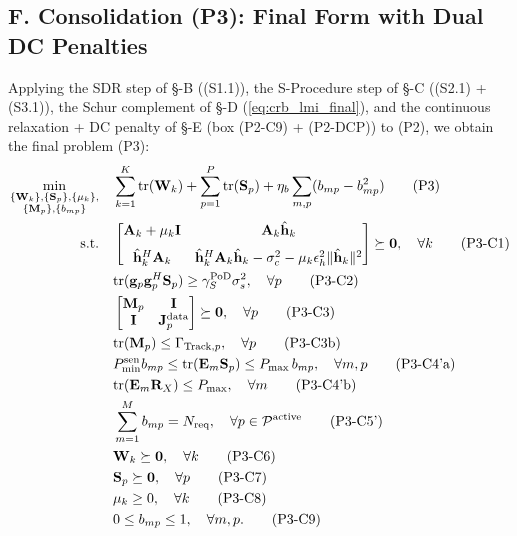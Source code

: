 \documentclass[12pt,a4paper]{article}
\newcommand{\vect}[1]{\mathbf{#1}}
\newcommand{\mat}[1]{\mathbf{#1}}
\newcommand{\tr}{\text{tr}}
\begin{document}
\subsection*{F. Consolidation (P3): Final Form with Dual DC Penalties}

Applying the SDR step of \S-B ((S1.1)), the S-Procedure step of \S-C ((S2.1) + (S3.1)), the Schur complement of \S-D (\eqref{eq:crb_lmi_final}), and the continuous relaxation + DC penalty of \S-E (box (P2-C9) + (P2-DCP)) to (P2), we obtain the final problem (P3):
\begin{align}
\min_{\substack{\{\mat{W}_k\}, \{\mat{S}_p\}, \{\mu_k\}, \\ \{\mat{M}_p\}, \{b_{mp}\}}} \quad
& \sum_{k=1}^K \tr(\mat{W}_k) + \sum_{p=1}^P \tr(\mat{S}_p) + \eta_b \sum_{m, p} (b_{mp} - b_{mp}^2) \tag{P3} \\
\text{s.t.} \quad
& \begin{bmatrix} \mat{A}_k + \mu_k \mat{I} & \mat{A}_k \hat{\vect{h}}_k \\[1.5ex] \hat{\vect{h}}_k^H \mat{A}_k & \hat{\vect{h}}_k^H \mat{A}_k \hat{\vect{h}}_k - \sigma_c^2 - \mu_k \epsilon_h^2 \|\hat{\vect{h}}_k\|^2 \end{bmatrix} \succeq \mat{0}, \quad \forall k \tag{P3-C1} \label{eq:p3c1} \\
& \tr(\vect{g}_p \vect{g}_p^H \mat{S}_p) \geq \gamma_S^{\text{PoD}} \sigma_s^2, \quad \forall p \tag{P3-C2} \label{eq:p3c2} \\
& \begin{bmatrix} \mat{M}_p & \mat{I} \\ \mat{I} & \mat{J}_p^{\text{data}} \end{bmatrix} \succeq \mat{0}, \quad \forall p \tag{P3-C3} \label{eq:p3c3} \\
& \tr(\mat{M}_p) \leq \Gamma_{\text{Track},p}, \quad \forall p \tag{P3-C3b} \label{eq:p3c3b} \\
& P_{\min}^{\rm sen}b_{mp}\leq\tr(\mat{E}_m \mat{S}_p) \leq P_{\max} \, b_{mp}, \quad \forall m, p \tag{P3-C4'a} \label{eq:p3c4a} \\
& \tr(\mat{E}_m \mat{R}_X) \leq P_{\max}, \quad \forall m \tag{P3-C4'b} \label{eq:p3c4b} \\
& \sum_{m=1}^{M} b_{mp} = N_{\text{req}}, \quad \forall p \in \mathcal{P}^{\text{active}} \tag{P3-C5'} \label{eq:p3c5} \\
& \mat{W}_k \succeq \mat{0}, \quad \forall k \tag{P3-C6} \label{eq:p3c6} \\
& \mat{S}_p \succeq \mat{0}, \quad \forall p \tag{P3-C7} \label{eq:p3c7} \\
& \mu_k \geq 0, \quad \forall k \tag{P3-C8} \label{eq:p3c8} \\
& 0 \leq b_{mp} \leq 1, \quad \forall m, p. \tag{P3-C9} \label{eq:p3c9}
\end{align}
\end{document}

